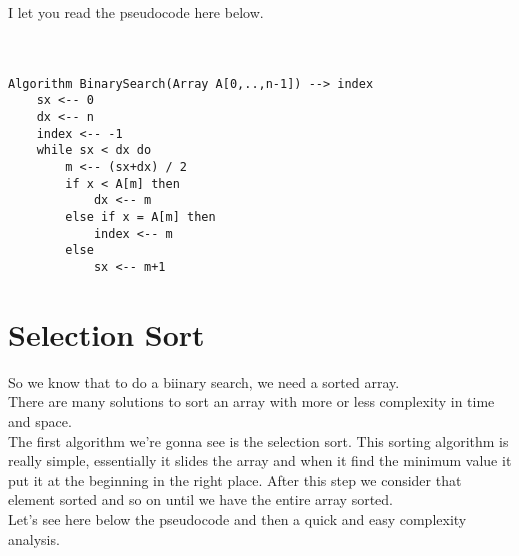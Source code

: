 \documentclass{article}
\begin{document}


I let you read the pseudocode here below. \\ \\ \\

\begin{lstlisting}[caption={\\\textit{Iterative version of the binary search algorithm.}}]
Algorithm BinarySearch(Array A[0,..,n-1]) --> index
	sx <-- 0
	dx <-- n
	index <-- -1
	while sx < dx do
		m <-- (sx+dx) / 2
		if x < A[m] then
			dx <-- m
		else if x = A[m] then
			index <-- m
		else
			sx <-- m+1
\end{lstlisting}

\section{Selection Sort}
So we know that to do a biinary search, we need a sorted array. \\
There are many solutions to sort an array with more or less complexity in time and space. \\
The first algorithm we're gonna see is the selection sort. This sorting algorithm is really simple, essentially it slides the array and when it find the minimum value it put it at the beginning in the right place. After this step we consider that element sorted and so on until we have the entire array sorted. \\
Let's see here below the pseudocode and then a quick and easy complexity analysis. \\
\end{document}
